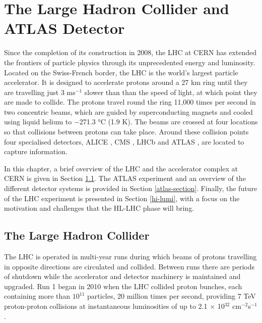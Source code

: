 \graphicspath{{\subfix{../images/}}}
\doublespacing

\chapter{The Large Hadron Collider and ATLAS Detector}
\label{chapter-2}

Since the completion of its construction in 2008, the \ac{LHC} \cite{Evans:2008zzb} at CERN has extended the frontiers of particle physics through its unprecedented energy and luminosity. Located on the Swiss-French border, the \ac{LHC} is the world’s largest particle accelerator. It is designed to accelerate protons around a 27 km ring until they are travelling just 3 ms$^{-1}$ slower than than the speed of light, at which point they are made to collide. The protons travel round the ring 11,000 times per second in two concentric beams, which are guided by superconducting magnets and cooled using liquid helium to \num{-271.3} \si{\degree}C (1.9 K). The beams are crossed at four locations so that collisions between protons can take place. Around these collision points four specialised detectors, ALICE \cite{AliceCollaboration_2008}, CMS \cite{CMS-TDR-08-001}, LHCb \cite{LHCbCollaboration_2008} and ATLAS \cite{PERF-2007-01}, are located to capture information.

In this chapter, a brief overview of the \ac{LHC} and the accelerator complex at CERN is given in Section \ref{the-lhc}. The ATLAS experiment and an overview of the different detector systems is provided in Section \ref{atlas-section}. Finally, the future of the \ac{LHC} experiment is presented in Section \ref{hi-lumi}, with a focus on the motivation and challenges that the  \ac{HL-LHC} phase will bring.


\section{The Large Hadron Collider}
\label{the-lhc}
The \ac{LHC} is operated in multi-year runs during which beams of protons travelling in opposite directions are circulated and collided. Between runs there are periods of shutdown while the accelerator and detector machinery is maintained and upgraded. Run 1 began in 2010 when the \ac{LHC} collided proton bunches, each containing more than $10^{11}$ particles, 20 million times per second, providing 7 TeV proton-proton collisions at instantaneous luminosities of up to 2.1 $\times$ 10$^{32}$ cm$^{−2}$s$^{−1}$.

